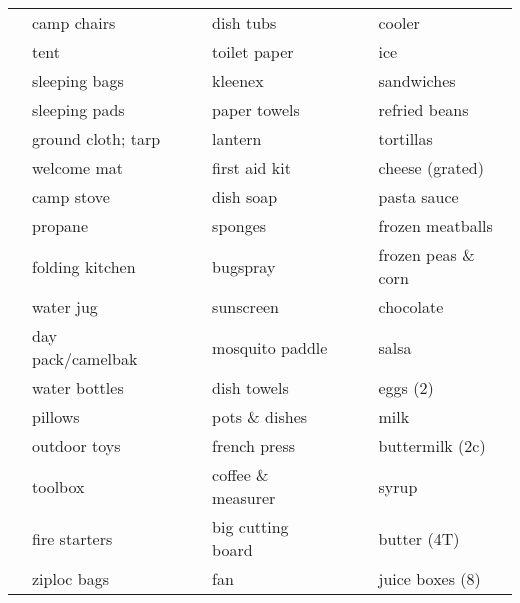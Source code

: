 \documentclass[10pt]{article}
\newcommand{\mybox}{\framebox[4mm]{\textcolor{white} m} \framebox[4mm]{\textcolor{white} m} }
\begin{document}
\pagestyle{empty}



\renewcommand{\arraystretch}{1.5}

\begin{tabular}{rlcrlcrl} \hline
\mybox & camp chairs   &\hspace{13mm}&\mybox & dish tubs   &\hspace{13mm}&\mybox & cooler \\
\mybox & tent                   &    &\mybox & toilet paper         &    &\mybox & ice \\
\mybox & sleeping bags          &    &\mybox & kleenex              &    &\mybox & sandwiches \\
\mybox & sleeping pads          &    &\mybox & paper towels         &    &\mybox & refried beans \\
\mybox & ground cloth; tarp     &    &\mybox & lantern              &    &\mybox & tortillas \\
\mybox & welcome mat            &    &\mybox & first aid kit        &    &\mybox & cheese (grated) \\
\mybox & camp stove             &    &\mybox & dish soap            &    &\mybox & pasta sauce \\
\mybox & propane                &    &\mybox & sponges              &    &\mybox & frozen meatballs \\
\mybox & folding kitchen        &    &\mybox & bugspray             &    &\mybox & frozen peas \& corn \\
\mybox & water jug              &    &\mybox & sunscreen            &    &\mybox & chocolate \\
\mybox & day pack/camelbak      &    &\mybox & mosquito paddle      &    &\mybox & salsa \\ \cline{4-5}
\mybox & water bottles          &    &\mybox & dish towels          &    &\mybox & eggs (2) \\
\mybox & pillows                &    &\mybox & pots \& dishes       &    &\mybox & milk \\
\mybox & outdoor toys           &    &\mybox & french press         &    &\mybox & buttermilk (2c) \\ \cline{1-2}
\mybox & toolbox                &    &\mybox & coffee \& measurer   &    &\mybox & syrup \\
\mybox & fire starters          &    &\mybox & big cutting board    &    &\mybox & butter (4T) \\
\mybox & ziploc bags            &    &\mybox & fan                  &    &\mybox & juice boxes (8) \\

\end{tabular}
\end{document}
